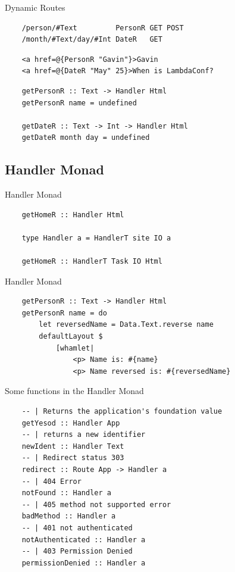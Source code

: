 \documentclass[pdf]{beamer}
\begin{document}
\begin{frame}[fragile]{Dynamic Routes}
  \begin{verbatim}
    /person/#Text         PersonR GET POST
    /month/#Text/day/#Int DateR   GET
  \end{verbatim}
  \pause
  \begin{verbatim}
    <a href=@{PersonR "Gavin"}>Gavin
    <a href=@{DateR "May" 25}>When is LambdaConf?
  \end{verbatim}
  \pause
  \begin{verbatim}
    getPersonR :: Text -> Handler Html
    getPersonR name = undefined

    getDateR :: Text -> Int -> Handler Html
    getDateR month day = undefined
  \end{verbatim}
\end{frame}

\subsection{Handler Monad}
\begin{frame}[fragile]{Handler Monad}
  \begin{verbatim}
    getHomeR :: Handler Html

    type Handler a = HandlerT site IO a

    getHomeR :: HandlerT Task IO Html
  \end{verbatim}
\end{frame}

\begin{frame}[fragile]{Handler Monad}
  \begin{verbatim}
    getPersonR :: Text -> Handler Html
    getPersonR name = do
        let reversedName = Data.Text.reverse name
        defaultLayout $
            [whamlet|
                <p> Name is: #{name}
                <p> Name reversed is: #{reversedName}
  \end{verbatim}
\end{frame}

\begin{frame}[fragile]{Some functions in the Handler Monad}
  \begin{verbatim}
    -- | Returns the application's foundation value
    getYesod :: Handler App
    -- | returns a new identifier
    newIdent :: Handler Text
    -- | Redirect status 303
    redirect :: Route App -> Handler a
    -- | 404 Error
    notFound :: Handler a
    -- | 405 method not supported error
    badMethod :: Handler a
    -- | 401 not authenticated
    notAuthenticated :: Handler a
    -- | 403 Permission Denied
    permissionDenied :: Handler a
  \end{verbatim}
\end{frame}
\end{document}
